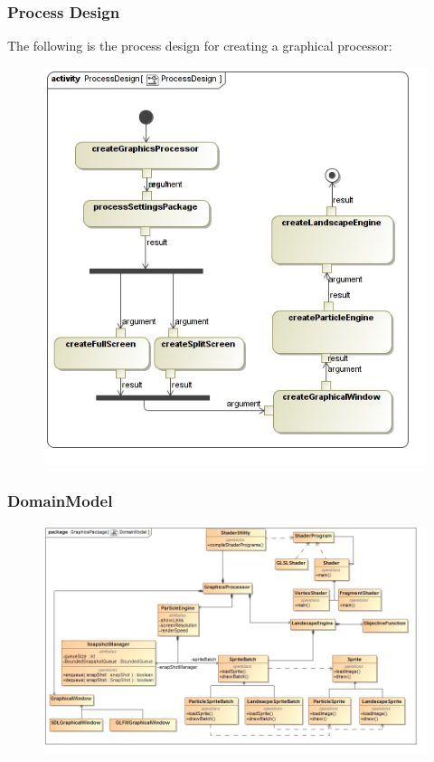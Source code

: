 \documentclass[11pt]{article}
\begin{document}
\subsubsection{Process Design}
The following is the process design for creating a graphical processor:
\begin{figure}[H]
\includegraphics[scale=0.45]{GraphicsProcessor/ProcessDesign.jpg}
\end{figure}

\subsubsection{DomainModel}
\begin{figure}[H]
\includegraphics[scale=0.45]{GraphicsProcessor/DomainModel.jpg}
\end{figure}
\end{document}
